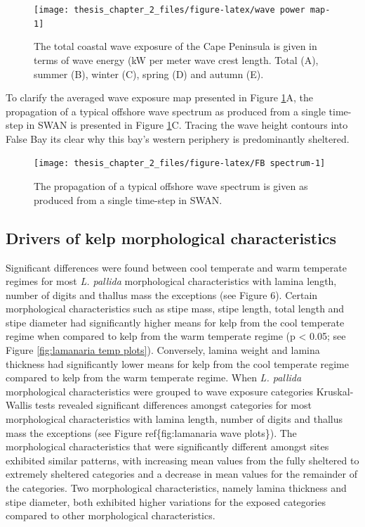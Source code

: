 \documentclass[
  a4paper,
]{article}
\begin{document}
\begin{figure}

{\centering \texttt{[image: thesis\_chapter\_2\_files/figure-latex/wave power map-1]} 

}

\caption{\label{fig:wave power map}The total coastal wave exposure of the Cape Peninsula is given in terms of wave energy (kW per meter wave crest length. Total (A), summer (B), winter (C), spring (D) and autumn (E).}\label{fig:wave power map}
\end{figure}

To clarify the averaged wave exposure map presented in Figure
\ref{fig:wave power map}A, the propagation of a typical offshore wave
spectrum as produced from a single time-step in SWAN is presented in
Figure \ref{fig:wave power map}C. Tracing the wave height contours into
False Bay its clear why this bay's western periphery is predominantly
sheltered.

\begin{figure}

{\centering \texttt{[image: thesis\_chapter\_2\_files/figure-latex/FB spectrum-1]} 

}

\caption{\label{fig:FB spectrum}The propagation of a typical offshore wave spectrum is given as produced from a single time-step in SWAN.}\label{fig:FB spectrum}
\end{figure}

\hypertarget{drivers-of-kelp-morphological-characteristics}{%
\subsection{Drivers of kelp morphological
characteristics}\label{drivers-of-kelp-morphological-characteristics}}

Significant differences were found between cool temperate and warm
temperate regimes for most \emph{L. pallida} morphological
characteristics with lamina length, number of digits and thallus mass
the exceptions (see Figure 6). Certain morphological characteristics
such as stipe mass, stipe length, total length and stipe diameter had
significantly higher means for kelp from the cool temperate regime when
compared to kelp from the warm temperate regime (p \textless{} 0.05; see
Figure \ref{fig:lamanaria temp plots}). Conversely, lamina weight and
lamina thickness had significantly lower means for kelp from the cool
temperate regime compared to kelp from the warm temperate regime. When
\emph{L. pallida} morphological characteristics were grouped to wave
exposure categories Kruskal-Wallis tests revealed significant
differences amongst categories for most morphological characteristics
with lamina length, number of digits and thallus mass the exceptions
(see Figure ref\{fig:lamanaria wave plots\}). The morphological
characteristics that were significantly different amongst sites
exhibited similar patterns, with increasing mean values from the fully
sheltered to extremely sheltered categories and a decrease in mean
values for the remainder of the categories. Two morphological
characteristics, namely lamina thickness and stipe diameter, both
exhibited higher variations for the exposed categories compared to other
morphological characteristics.
\end{document}
